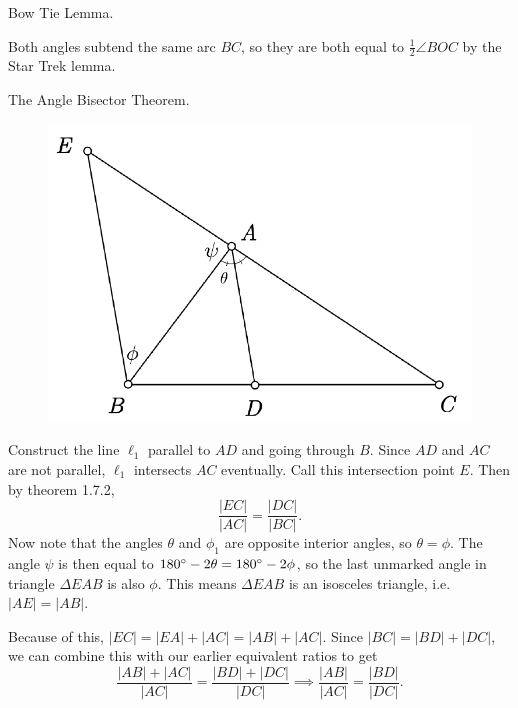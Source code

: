 \documentclass[twoside,10pt]{article}
\begin{document}

\begin{exer}[1.29]
Bow Tie Lemma.
\end{exer}

Both angles subtend the same arc $BC$, so they are both equal to $\frac{1}{2} \angle BOC$ by the Star Trek lemma.

\newpage

\begin{exer}[1.43]
The Angle Bisector Theorem.
\end{exer}

\begin{figure}[H]
	\centering
	\includegraphics[scale=0.7]{fig/43.pdf}
\end{figure}


Construct the line $\ell_1$ parallel to $AD$ and going through $B$. Since $AD$ and $AC$ are not parallel, $\ell_1$ intersects $AC$ eventually. Call this intersection point $E$. Then by theorem 1.7.2,
\[
	\frac{|EC|}{|AC|} = \frac{|DC|}{|BC|} .
\] Now note that the angles $\theta$ and $\phi_1$ are opposite interior angles, so $\theta=\phi$. The angle $\psi$ is then equal to $180^\circ -2\theta = 180^\circ -2\phi$, so the last unmarked angle in triangle $\Delta EAB$ is also $\phi$. This means $\Delta EAB$ is an isosceles triangle, i.e. $|AE|=|AB|$.

Because of this, $|EC| = |EA|+|AC| = |AB|+|AC|$. Since $|BC| = |BD|+|DC|$, we can combine this with our earlier equivalent ratios to get
\[
\frac{|AB|+|AC|}{|AC|} = \frac{|BD|+|DC|}{|DC|} \implies \frac{|AB|}{|AC|} = \frac{|BD|}{|DC|} .
\] 
\end{document}
